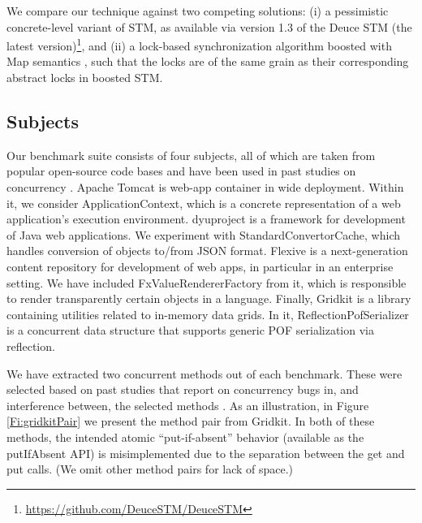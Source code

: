 We compare our technique against two competing solutions: (i) a pessimistic concrete-level variant of STM, as available via version 1.3 of the Deuce STM (the latest version)\footnote{
		\url{https://github.com/DeuceSTM/DeuceSTM}
	}, and (ii)  a lock-based synchronization algorithm boosted with {\sf Map} semantics \cite{ppopp/HerlihyK08}, such that the locks are of the same grain as their corresponding abstract locks in boosted STM.

\subsection{Subjects}

Our benchmark suite consists of four subjects, all of which are taken from popular open-source code bases and have been used in past studies on concurrency \cite{oopsla/ShachamBASVY11,issta/ShachamYGABSV14}.
	Apache Tomcat is web-app container in wide deployment. Within it, we consider {\sf ApplicationContext}, which is a concrete representation of a web application's execution environment.
	dyuproject is a framework for development of Java web applications. We experiment with {\sf StandardConvertorCache}, which handles conversion of objects to/from JSON format.
	Flexive is a next-generation content repository for development of web apps, in particular in an enterprise setting. We have included {\sf FxValueRendererFactory} from it, which is responsible to render transparently certain objects in a language.
	Finally, Gridkit is a library containing utilities related to in-memory data grids. In it, {\sf ReflectionPofSerializer} is a concurrent data structure that supports generic POF serialization via reflection.

We have extracted two concurrent methods out of each benchmark. These were selected based on past studies that report on concurrency bugs in, and interference between, the selected methods \cite{oopsla/ShachamBASVY11}. 
%
As an illustration, in Figure \ref{Fi:gridkitPair} we present the method pair from Gridkit. In both of these methods, the intended atomic ``put-if-absent'' behavior (available as the {\sf putIfAbsent} API) is misimplemented due to the separation between the {\sf get} and {\sf put} calls. (We omit other method pairs for lack of space.)

